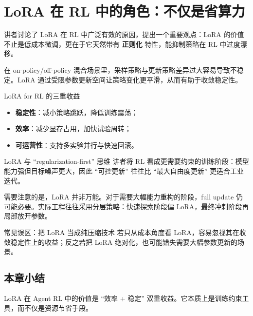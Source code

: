 \section{LoRA 在 RL 中的角色：不仅是省算力}

讲者讨论了 LoRA 在 RL 中广泛有效的原因，提出一个重要观点：LoRA 的价值不止是低成本微调，更在于它天然带有 \textbf{正则化} 特性，能抑制策略在 RL 中过度漂移。

在 on-policy/off-policy 混合场景里，采样策略与更新策略差异过大容易导致不稳定。LoRA 通过受限参数更新空间让策略变化更平滑，从而有助于收敛稳定性。

\begin{importantbox}{LoRA for RL 的三重收益}
\begin{itemize}
    \item \textbf{稳定性}：减小策略跳跃，降低训练震荡；
    \item \textbf{效率}：减少显存占用，加快试验周转；
    \item \textbf{可运营性}：支持多实验并行与快速回滚。
\end{itemize}
\end{importantbox}

\begin{knowledgebox}{LoRA 与 ``regularization-first'' 思维}
讲者将 RL 看成更需要约束的训练阶段：模型能力强但目标噪声更大，因此 ``可控更新'' 往往比 ``最大自由度更新'' 更适合工业迭代。
\end{knowledgebox}

需要注意的是，LoRA 并非万能。对于需要大幅能力重构的阶段，full update 仍可能必要。实际工程往往采用分层策略：快速探索阶段偏 LoRA，最终冲刺阶段再局部放开参数。

\begin{warningbox}{常见误区：把 LoRA 当成纯压缩技术}
若只从成本角度看 LoRA，容易忽视其在收敛稳定性上的收益；反之若把 LoRA 绝对化，也可能错失需要大幅参数更新的场景。
\end{warningbox}

\subsection{本章小结}
LoRA 在 Agent RL 中的价值是 ``效率 + 稳定'' 双重收益。它本质上是训练约束工具，而不仅是资源节省手段。

